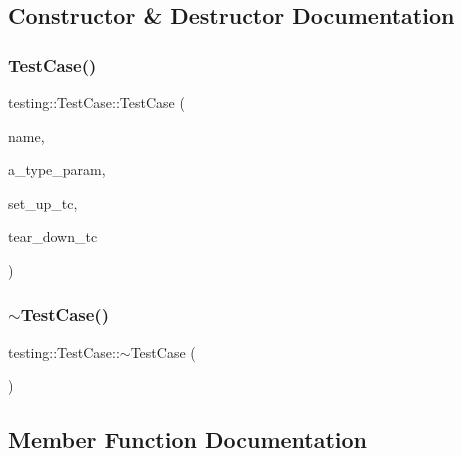 \subsection{Constructor \& Destructor Documentation}
\mbox{\label{classtesting_1_1_test_case_a8a43b04703bfc7d56597fcb9b76ffbf5}} 
\subsubsection{\texorpdfstring{TestCase()}{TestCase()}}
{\footnotesize\ttfamily testing\+::\+Test\+Case\+::\+Test\+Case (\begin{DoxyParamCaption}\item[{const char $\ast$}]{name,  }\item[{const char $\ast$}]{a\+\_\+type\+\_\+param,  }\item[{\mbox{\hyperlink{classtesting_1_1_test_a5f2a051d1d99c9b784c666c586186cf9}{Test\+::\+Set\+Up\+Test\+Case\+Func}}}]{set\+\_\+up\+\_\+tc,  }\item[{\mbox{\hyperlink{classtesting_1_1_test_aa0f532e93b9f3500144c53f31466976c}{Test\+::\+Tear\+Down\+Test\+Case\+Func}}}]{tear\+\_\+down\+\_\+tc }\end{DoxyParamCaption})}

\mbox{\label{classtesting_1_1_test_case_a96ab68dd1f8f64a7087ac34ff64a2e46}} 
\subsubsection{\texorpdfstring{$\sim$TestCase()}{~TestCase()}}
{\footnotesize\ttfamily testing\+::\+Test\+Case\+::$\sim$\+Test\+Case (\begin{DoxyParamCaption}{ }\end{DoxyParamCaption})\hspace{0.3cm}{\ttfamily [virtual]}}



\subsection{Member Function Documentation}
\mbox{\label{classtesting_1_1_test_case_a6d5fc5003bc3352f3ddae7dadc6d2364}} 
